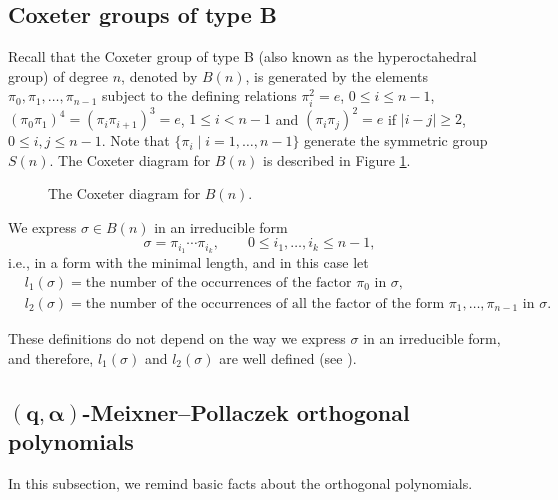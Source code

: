 \documentclass[pdftex]{sigma}
\numberwithin{equation}{section}
\newcommand{\q}{q}
\newcommand{\s}{\alpha}%
\begin{document}
\subsection{Coxeter groups of type B}
Recall that the Coxeter
group of type B (also known as the hyperoctahedral group) of degree $n$, denoted by $B(n)$, is generated
by the elements $\pi_0, \pi_1, \dots , \pi_{n-1}$ subject to the defining relations $\pi_i^2=e$, $0\leq i \leq n-1$, $(\pi_0\pi_1)^4=(\pi_i \pi_{i+1})^3=e$, $1\leq i < n-1$ and $(\pi_i \pi_j)^2=e$ if $|i-j|\geq2$, $0\leq i,j\leq n-1$. Note that $\{\pi_i\mid i=1,\dots,n-1\}$ generate the symmetric group $S(n)$.
The Coxeter diagram for $B(n)$ is described in Figure \ref{fig:BN}.
\begin{figure}[htp]
\centering
		\caption{The Coxeter diagram for $B(n)$.}
		\label{fig:BN}
\end{figure}


We express $\sigma \in B(n)$ in an irreducible form
\[
\sigma=\pi_{i_1} \cdots \pi_{i_{k}}, \qquad 0\leq i_1,\dots,i_k \leq n-1,
\]
i.e., in a form with the minimal length, and in this case let
\begin{align*}
	&l_1(\sigma)= \text{the number of the occurrences of the factor $\pi_0$ in $\sigma$},
\\[1mm]
	&l_2(\sigma) = \text{the number of the occurrences of all the factor of the form $\pi_1,\dots,\pi_{n-1}$ in $\sigma$}.
\end{align*}

\begin{Remark}
These definitions do not depend on the way we express $\sigma$ in an irreducible form, and therefore, $l_1(\sigma)$ and $l_2(\sigma)$ are well defined (see \cite[Proposition~1]{BozejkoSzwarc2003}).
\end{Remark}

\subsection[(q,alpha)-Meixner--Pollaczek orthogonal polynomials]{$\boldsymbol{(\q,\s)}$-Meixner--Pollaczek orthogonal polynomials}
In this subsection, we remind basic facts about the
orthogonal polynomials.
\end{document}
